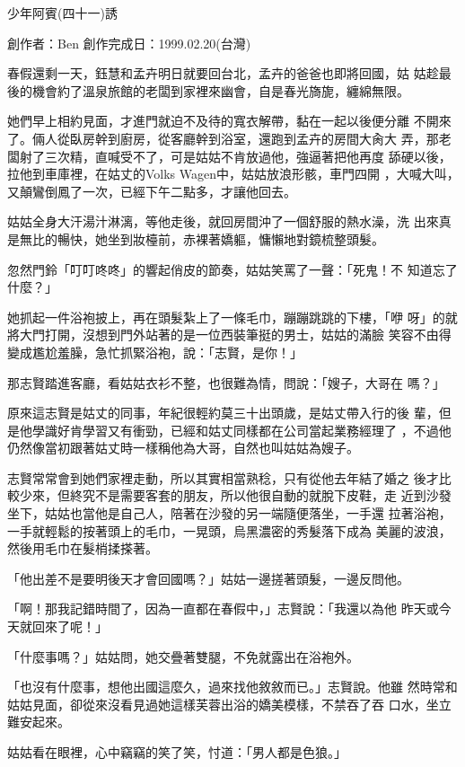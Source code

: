 



少年阿賓(四十一)誘

創作者：Ben
創作完成日：1999.02.20(台灣)


春假還剩一天，鈺慧和孟卉明日就要回台北，孟卉的爸爸也即將回國，姑
姑趁最後的機會約了溫泉旅館的老闆到家裡來幽會，自是春光旖旎，纏綿無限。

她們早上相約見面，才進門就迫不及待的寬衣解帶，黏在一起以後便分離
不開來了。倆人從臥房幹到廚房，從客廳幹到浴室，還跑到孟卉的房間大肏大
弄，那老闆射了三次精，直喊受不了，可是姑姑不肯放過他，強逼著把他再度
舔硬以後，拉他到車庫裡，在姑丈的Volks Wagen中，姑姑放浪形骸，車門四開
，大喊大叫，又顛鸞倒鳳了一次，已經下午二點多，才讓他回去。

姑姑全身大汗湯汁淋漓，等他走後，就回房間沖了一個舒服的熱水澡，洗
出來真是無比的暢快，她坐到妝檯前，赤裸著嬌軀，慵懶地對鏡梳整頭髮。

忽然門鈴「叮叮咚咚」的響起俏皮的節奏，姑姑笑罵了一聲：「死鬼！不
知道忘了什麼？」

她抓起一件浴袍披上，再在頭髮紮上了一條毛巾，蹦蹦跳跳的下樓，「咿
呀」的就將大門打開，沒想到門外站著的是一位西裝筆挺的男士，姑姑的滿臉
笑容不由得變成尷尬羞臊，急忙抓緊浴袍，說：「志賢，是你！」

那志賢踏進客廳，看姑姑衣衫不整，也很難為情，問說：「嫂子，大哥在
嗎？」

原來這志賢是姑丈的同事，年紀很輕約莫三十出頭歲，是姑丈帶入行的後
輩，但是他學識好肯學習又有衝勁，已經和姑丈同樣都在公司當起業務經理了
，不過他仍然像當初跟著姑丈時一樣稱他為大哥，自然也叫姑姑為嫂子。

志賢常常會到她們家裡走動，所以其實相當熟稔，只有從他去年結了婚之
後才比較少來，但終究不是需要客套的朋友，所以他很自動的就脫下皮鞋，走
近到沙發坐下，姑姑也當他是自己人，陪著在沙發的另一端隨便落坐，一手還
拉著浴袍，一手就輕鬆的按著頭上的毛巾，一晃頭，烏黑濃密的秀髮落下成為
美麗的波浪，然後用毛巾在髮梢揉搽著。

「他出差不是要明後天才會回國嗎？」姑姑一邊搓著頭髮，一邊反問他。

「啊！那我記錯時間了，因為一直都在春假中，」志賢說：「我還以為他
昨天或今天就回來了呢！」

「什麼事嗎？」姑姑問，她交疊著雙腿，不免就露出在浴袍外。

「也沒有什麼事，想他出國這麼久，過來找他敘敘而已。」志賢說。他雖
然時常和姑姑見面，卻從來沒看見過她這樣芙蓉出浴的嬌美模樣，不禁吞了吞
口水，坐立難安起來。

姑姑看在眼裡，心中竊竊的笑了笑，忖道：「男人都是色狼。」

